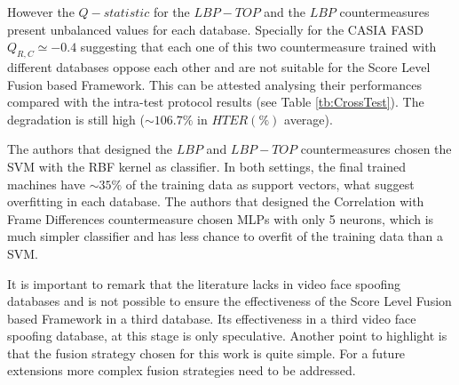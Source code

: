 However the $Q-statistic$ for the $LBP-TOP$ and the $LBP$ countermeasures present unbalanced values for each database. Specially for the CASIA FASD $Q_{R,C}\simeq-0.4$ suggesting that each one of this two countermeasure trained with different databases oppose each other and are not suitable for the Score Level Fusion based Framework. This can be attested analysing their performances compared with the intra-test protocol results (see Table \ref{tb:CrossTest}). The degradation is still high ($\sim106.7\%$ in $HTER(\%)$ average).

The authors that designed the $LBP$ and $LBP-TOP$ countermeasures chosen the SVM with the RBF kernel as classifier. In both settings, the final trained machines have $\sim35\%$ of the training data as support vectors, what suggest overfitting in each database. The authors that designed the Correlation with Frame Differences countermeasure chosen MLPs with only 5 neurons, which is much simpler classifier and has less chance to overfit of the training data than a SVM.

It is important to remark that the literature lacks in video face spoofing databases and is not possible to ensure the effectiveness of the Score Level Fusion based Framework in a third database. Its effectiveness in a third video face spoofing database, at this stage is only speculative. Another point to highlight is that the fusion strategy chosen for this work is quite simple. For a future extensions more complex fusion strategies need to be addressed.

